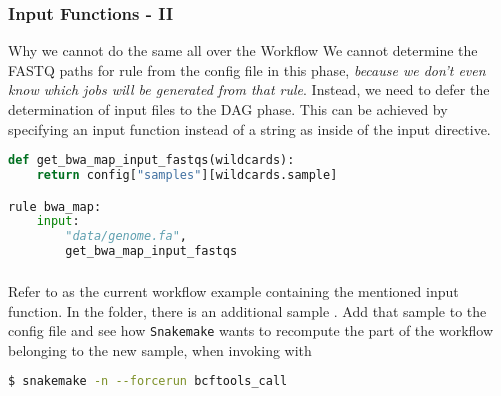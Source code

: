 \begin{frame}[fragile]
  \frametitle{Input Functions - II}
    \begin{alertblock}{Why we cannot do the same all over the Workflow}
    We cannot determine the FASTQ paths for rule  from the config file in this phase, \emph{because we don’t even know which jobs will be generated from that rule}. Instead, we need to defer the determination of input files to the DAG phase. This can be achieved by specifying an input function instead of a string as inside of the input directive.
  \end{alertblock}
  \begin{lstlisting}[language=Python,style=Python]
def get_bwa_map_input_fastqs(wildcards):
    return config["samples"][wildcards.sample]

rule bwa_map:
    input:
        "data/genome.fa",
        get_bwa_map_input_fastqs
  \end{lstlisting}
\end{frame}

\begin{frame}[fragile]
  \frametitle{}
  \begin{task}
  	 Refer to  as the current workflow example containing the mentioned input function.\newline
  	 In the  folder, there is an additional sample . Add that sample to the config file and see how \texttt{Snakemake} wants to recompute the part of the workflow belonging to the new sample, when invoking with 
  	 \begin{lstlisting}[language=Bash, style=Shell]
$ snakemake -n --forcerun bcftools_call
  	 \end{lstlisting}
  \end{task}
 
\end{frame}

